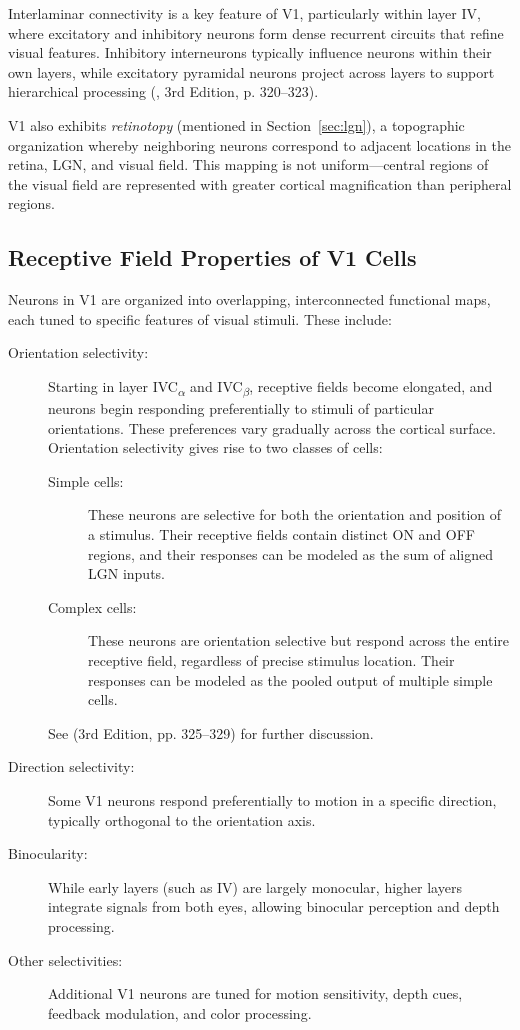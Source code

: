 Interlaminar connectivity is a key feature of V1, particularly within layer IV, where excitatory and inhibitory neurons form dense recurrent circuits that refine visual features. Inhibitory interneurons typically influence neurons within their own layers, while excitatory pyramidal neurons project across layers to support hierarchical processing (\citet{bear2020neuroscience}, 3rd Edition, p. 320--323).

V1 also exhibits \emph{retinotopy} (mentioned in Section~\ref{sec:lgn}), a topographic organization whereby neighboring neurons correspond to adjacent locations in the retina, LGN, and visual field. This mapping is not uniform—central regions of the visual field are represented with greater cortical magnification than peripheral regions.

\subsection{Receptive Field Properties of V1 Cells}
\label{subsec:receptive_field}

Neurons in V1 are organized into overlapping, interconnected functional maps, each tuned to specific features of visual stimuli. These include:

\begin{description}
    \item[Orientation selectivity:] Starting in layer IVC\textsubscript{\ensuremath{\alpha}} and IVC\textsubscript{\ensuremath{\beta}}, receptive fields become elongated, and neurons begin responding preferentially to stimuli of particular orientations. These preferences vary gradually across the cortical surface. Orientation selectivity gives rise to two classes of cells:
    \begin{description}
        \item[Simple cells:] These neurons are selective for both the orientation and position of a stimulus. Their receptive fields contain distinct ON and OFF regions, and their responses can be modeled as the sum of aligned LGN inputs.
        \item[Complex cells:] These neurons are orientation selective but respond across the entire receptive field, regardless of precise stimulus location. Their responses can be modeled as the pooled output of multiple simple cells.
    \end{description}
    See \citet{bear2020neuroscience} (3rd Edition, pp. 325--329) for further discussion.

    \item[Direction selectivity:] Some V1 neurons respond preferentially to motion in a specific direction, typically orthogonal to the orientation axis.

    \item[Binocularity:] While early layers (such as IV) are largely monocular, higher layers integrate signals from both eyes, allowing binocular perception and depth processing.

    \item[Other selectivities:] Additional V1 neurons are tuned for motion sensitivity, depth cues, feedback modulation, and color processing.
\end{description}

